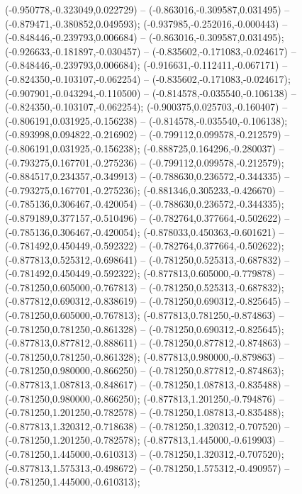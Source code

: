  (-0.950778,-0.323049,0.022729) -- (-0.863016,-0.309587,0.031495) -- (-0.879471,-0.380852,0.049593);
 (-0.937985,-0.252016,-0.000443) -- (-0.848446,-0.239793,0.006684) -- (-0.863016,-0.309587,0.031495);
 (-0.926633,-0.181897,-0.030457) -- (-0.835602,-0.171083,-0.024617) -- (-0.848446,-0.239793,0.006684);
 (-0.916631,-0.112411,-0.067171) -- (-0.824350,-0.103107,-0.062254) -- (-0.835602,-0.171083,-0.024617);
 (-0.907901,-0.043294,-0.110500) -- (-0.814578,-0.035540,-0.106138) -- (-0.824350,-0.103107,-0.062254);
 (-0.900375,0.025703,-0.160407) -- (-0.806191,0.031925,-0.156238) -- (-0.814578,-0.035540,-0.106138);
 (-0.893998,0.094822,-0.216902) -- (-0.799112,0.099578,-0.212579) -- (-0.806191,0.031925,-0.156238);
 (-0.888725,0.164296,-0.280037) -- (-0.793275,0.167701,-0.275236) -- (-0.799112,0.099578,-0.212579);
 (-0.884517,0.234357,-0.349913) -- (-0.788630,0.236572,-0.344335) -- (-0.793275,0.167701,-0.275236);
 (-0.881346,0.305233,-0.426670) -- (-0.785136,0.306467,-0.420054) -- (-0.788630,0.236572,-0.344335);
 (-0.879189,0.377157,-0.510496) -- (-0.782764,0.377664,-0.502622) -- (-0.785136,0.306467,-0.420054);
 (-0.878033,0.450363,-0.601621) -- (-0.781492,0.450449,-0.592322) -- (-0.782764,0.377664,-0.502622);
 (-0.877813,0.525312,-0.698641) -- (-0.781250,0.525313,-0.687832) -- (-0.781492,0.450449,-0.592322);
 (-0.877813,0.605000,-0.779878) -- (-0.781250,0.605000,-0.767813) -- (-0.781250,0.525313,-0.687832);
 (-0.877812,0.690312,-0.838619) -- (-0.781250,0.690312,-0.825645) -- (-0.781250,0.605000,-0.767813);
 (-0.877813,0.781250,-0.874863) -- (-0.781250,0.781250,-0.861328) -- (-0.781250,0.690312,-0.825645);
 (-0.877813,0.877812,-0.888611) -- (-0.781250,0.877812,-0.874863) -- (-0.781250,0.781250,-0.861328);
 (-0.877813,0.980000,-0.879863) -- (-0.781250,0.980000,-0.866250) -- (-0.781250,0.877812,-0.874863);
 (-0.877813,1.087813,-0.848617) -- (-0.781250,1.087813,-0.835488) -- (-0.781250,0.980000,-0.866250);
 (-0.877813,1.201250,-0.794876) -- (-0.781250,1.201250,-0.782578) -- (-0.781250,1.087813,-0.835488);
 (-0.877813,1.320312,-0.718638) -- (-0.781250,1.320312,-0.707520) -- (-0.781250,1.201250,-0.782578);
 (-0.877813,1.445000,-0.619903) -- (-0.781250,1.445000,-0.610313) -- (-0.781250,1.320312,-0.707520);
 (-0.877813,1.575313,-0.498672) -- (-0.781250,1.575312,-0.490957) -- (-0.781250,1.445000,-0.610313);
